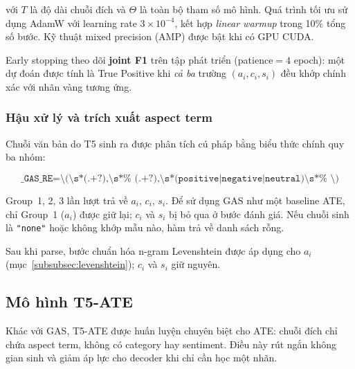 \noindent với $T$ là độ dài chuỗi đích và $\Theta$ là toàn bộ tham số
mô hình.  Quá trình tối ưu sử dụng AdamW với learning rate
$3 \times 10^{-4}$, kết hợp \textit{linear warmup} trong 10\% tổng
số bước.  Kỹ thuật mixed precision (AMP) được bật khi có GPU CUDA.

Early stopping theo dõi \textbf{joint F1} trên tập phát triển
(patience$= 4$ epoch): một dự đoán được tính là True Positive khi
\textit{cả ba} trường $(a_i, c_i, s_i)$ đều khớp chính xác với nhãn
vàng tương ứng.

\subsubsection{Hậu xử lý và trích xuất aspect term}
\label{subsubsec:gas_postprocess}

Chuỗi văn bản do T5 sinh ra được phân tích cú pháp bằng biểu thức
chính quy ba nhóm:

\begin{equation}
  \texttt{\_GAS\_RE} =
    \texttt{\textbackslash(\textbackslash s*(.+?),\textbackslash s*%
    (.+?),\textbackslash s*(positive|negative|neutral)\textbackslash s*%
    \textbackslash)}
  \label{eq:gas_regex}
\end{equation}

\noindent Group~1, 2, 3 lần lượt trả về $a_i$, $c_i$, $s_i$.  Để
sử dụng GAS như một baseline ATE, chỉ Group~1 ($a_i$) được giữ lại;
$c_i$ và $s_i$ bị bỏ qua ở bước đánh giá.  Nếu chuỗi sinh là
\texttt{"none"} hoặc không khớp mẫu nào, hàm trả về danh sách rỗng.

Sau khi parse, bước chuẩn hóa n-gram Levenshtein được áp dụng cho
$a_i$ (mục~\ref{subsubsec:levenshtein}); $c_i$ và $s_i$ giữ nguyên.

\subsection{Mô hình T5-ATE}
\label{subsec:t5ate}

Khác với GAS, T5-ATE được huấn luyện chuyên biệt cho ATE: chuỗi đích
chỉ chứa aspect term, không có category hay sentiment.  Điều này rút
ngắn không gian sinh và giảm áp lực cho decoder khi chỉ cần học một
nhãn.

